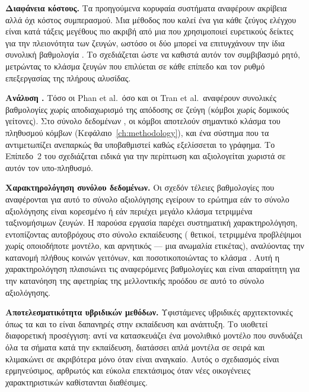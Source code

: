 \textbf{Διαφάνεια κόστους.} Τα προηγούμενα κορυφαία συστήματα αναφέρουν ακρίβεια
αλλά όχι κόστος συμπερασμού.
Μια μέθοδος που καλεί ένα 
για κάθε ζεύγος ελέγχου είναι κατά τάξεις μεγέθους πιο ακριβή από μια που
χρησιμοποιεί ευρετικούς δείκτες για την πλειονότητα των ζευγών, ωστόσο οι δύο μπορεί να
επιτυγχάνουν την ίδια συνολική βαθμολογία .
Το  σχεδιάζεται ώστε να
καθιστά αυτόν τον συμβιβασμό ρητό, μετρώντας το κλάσμα ζευγών που επιλύεται σε κάθε
επίπεδο και τον ρυθμό επεξεργασίας της πλήρους αλυσίδας.

\textbf{Ανάλυση .} Τόσο οι Phan et al.\ όσο και οι Tran
et al.\ αναφέρουν συνολικές βαθμολογίες χωρίς αποδιαχωρισμό της απόδοσης σε ζεύγη
 (κόμβοι χωρίς δομικούς γείτονες).
Στο σύνολο δεδομένων
, οι κόμβοι  αποτελούν σημαντικό κλάσμα του
πληθυσμού κόμβων (Κεφάλαιο~\ref{ch:methodology}), και ένα σύστημα που τα
αντιμετωπίζει ανεπαρκώς θα υποβαθμιστεί καθώς εξελίσσεται το γράφημα.
Το Επίπεδο~2 του
 σχεδιάζεται ειδικά για την περίπτωση  και
αξιολογείται χωριστά σε αυτόν τον υπο-πληθυσμό.

\textbf{Χαρακτηρολόγηση συνόλου δεδομένων.} Οι σχεδόν τέλειες βαθμολογίες που
αναφέρονται για αυτό το σύνολο αξιολόγησης εγείρουν το ερώτημα εάν το σύνολο
αξιολόγησης είναι κορεσμένο ή εάν περιέχει μεγάλο κλάσμα τετριμμένα ταξινομήσιμων
ζευγών.
Η παρούσα εργασία παρέχει συστηματική χαρακτηρολόγηση, εντοπίζοντας \SelfLoopsTrain{}
αυτοβρόχους στο σύνολο εκπαίδευσης (\SelfLoopsTrainPos{} θετικοί, τετριμμένα προβλέψιμοι χωρίς
οποιοδήποτε μοντέλο, και \SelfLoopsTrainNeg{} αρνητικός --- μια ανωμαλία ετικέτας), αναλύοντας
την κατανομή πλήθους κοινών γειτόνων, και ποσοτικοποιώντας το κλάσμα .
Αυτή η χαρακτηρολόγηση πλαισιώνει τις αναφερόμενες βαθμολογίες και
είναι απαραίτητη για την κατανόηση της αφετηρίας της μελλοντικής προόδου σε αυτό το
σύνολο αξιολόγησης.

\textbf{Αποτελεσματικότητα υβριδικών μεθόδων.} Υφιστάμενες υβριδικές αρχιτεκτονικές
όπως τα  και το  είναι δαπανηρές στην εκπαίδευση και
ανάπτυξη.
Το  υιοθετεί διαφορετική προσέγγιση: αντί να κατασκευάζει ένα
μονολιθικό μοντέλο που συνδυάζει όλα τα σήματα κατά την εκπαίδευση, διατάσσει απλά
μοντέλα σε σειρά και κλιμακώνει σε ακριβότερα μόνο όταν είναι αναγκαίο.
Αυτός ο
σχεδιασμός είναι ερμηνεύσιμος, αρθρωτός και εύκολα επεκτάσιμος όταν νέες οικογένειες
χαρακτηριστικών καθίστανται διαθέσιμες.
